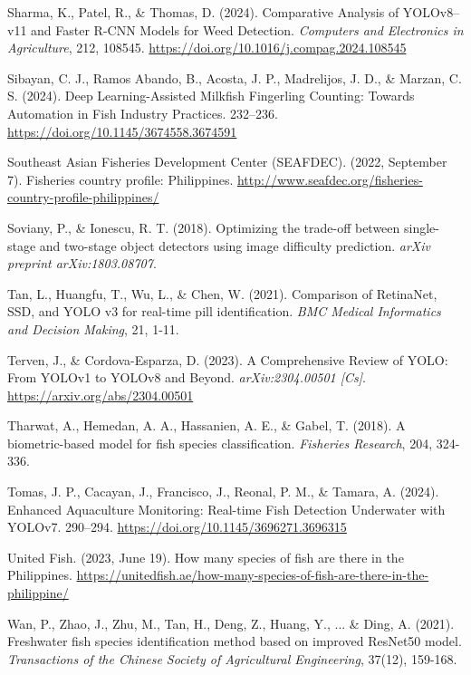 \begin{bibliography}
 Sharma, K., Patel, R., \& Thomas, D. (2024). Comparative Analysis of YOLOv8–v11 and Faster R-CNN Models for Weed Detection. \textit{Computers and Electronics in Agriculture}, 212, 108545. \url{https://doi.org/10.1016/j.compag.2024.108545}

 Sibayan, C. J., Ramos Abando, B., Acosta, J. P., Madrelijos, J. D., \& Marzan, C. S. (2024). Deep Learning-Assisted Milkfish Fingerling Counting: Towards Automation in Fish Industry Practices. 232–236. \url{https://doi.org/10.1145/3674558.3674591}

 Southeast Asian Fisheries Development Center (SEAFDEC). (2022, September 7). Fisheries country profile: Philippines. \url{http://www.seafdec.org/fisheries-country-profile-philippines/}

 Soviany, P., \& Ionescu, R. T. (2018). Optimizing the trade-off between single-stage and two-stage object detectors using image difficulty prediction. \textit{arXiv preprint arXiv:1803.08707}.

 Tan, L., Huangfu, T., Wu, L., \& Chen, W. (2021). Comparison of RetinaNet, SSD, and YOLO v3 for real-time pill identification. \textit{BMC Medical Informatics and Decision Making}, 21, 1-11.

 Terven, J., \& Cordova-Esparza, D. (2023). A Comprehensive Review of YOLO: From YOLOv1 to YOLOv8 and Beyond. \textit{arXiv:2304.00501 [Cs]}. \url{https://arxiv.org/abs/2304.00501}

 Tharwat, A., Hemedan, A. A., Hassanien, A. E., \& Gabel, T. (2018). A biometric-based model for fish species classification. \textit{Fisheries Research}, 204, 324-336.

 Tomas, J. P., Cacayan, J., Francisco, J., Reonal, P. M., \& Tamara, A. (2024). Enhanced Aquaculture Monitoring: Real-time Fish Detection Underwater with YOLOv7. 290–294. \url{https://doi.org/10.1145/3696271.3696315}

 United Fish. (2023, June 19). How many species of fish are there in the Philippines. \url{https://unitedfish.ae/how-many-species-of-fish-are-there-in-the-philippine/}

 Wan, P., Zhao, J., Zhu, M., Tan, H., Deng, Z., Huang, Y., ... \& Ding, A. (2021). Freshwater fish species identification method based on improved ResNet50 model. \textit{Transactions of the Chinese Society of Agricultural Engineering}, 37(12), 159-168.


\end{bibliography}

